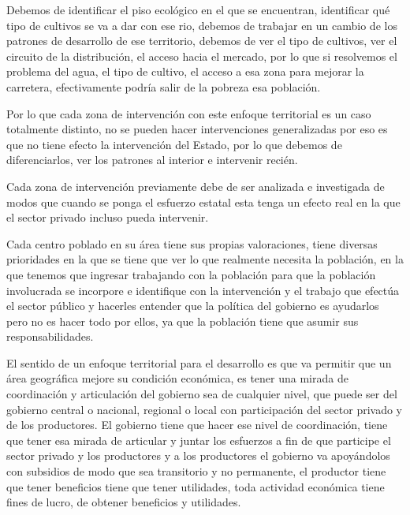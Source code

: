 \documentclass[
  a4paper,
]{article}
\begin{document}
Debemos de identificar el piso ecológico en el que se encuentran,
identificar qué tipo de cultivos se va a dar con ese rio, debemos de
trabajar en un cambio de los patrones de desarrollo de ese territorio,
debemos de ver el tipo de cultivos, ver el circuito de la distribución,
el acceso hacia el mercado, por lo que si resolvemos el problema del
agua, el tipo de cultivo, el acceso a esa zona para mejorar la
carretera, efectivamente podría salir de la pobreza esa población.

Por lo que cada zona de intervención con este enfoque territorial es un
caso totalmente distinto, no se pueden hacer intervenciones
generalizadas por eso es que no tiene efecto la intervención del Estado,
por lo que debemos de diferenciarlos, ver los patrones al interior e
intervenir recién.

Cada zona de intervención previamente debe de ser analizada e
investigada de modos que cuando se ponga el esfuerzo estatal esta tenga
un efecto real en la que el sector privado incluso pueda intervenir.

Cada centro poblado en su área tiene sus propias valoraciones, tiene
diversas prioridades en la que se tiene que ver lo que realmente
necesita la población, en la que tenemos que ingresar trabajando con la
población para que la población involucrada se incorpore e identifique
con la intervención y el trabajo que efectúa el sector público y
hacerles entender que la política del gobierno es ayudarlos pero no es
hacer todo por ellos, ya que la población tiene que asumir sus
responsabilidades.

El sentido de un enfoque territorial para el desarrollo es que va
permitir que un área geográfica mejore su condición económica, es tener
una mirada de coordinación y articulación del gobierno sea de cualquier
nivel, que puede ser del gobierno central o nacional, regional o local
con participación del sector privado y de los productores. El gobierno
tiene que hacer ese nivel de coordinación, tiene que tener esa mirada de
articular y juntar los esfuerzos a fin de que participe el sector
privado y los productores y a los productores el gobierno va apoyándolos
con subsidios de modo que sea transitorio y no permanente, el productor
tiene que tener beneficios tiene que tener utilidades, toda actividad
económica tiene fines de lucro, de obtener beneficios y utilidades.
\end{document}

